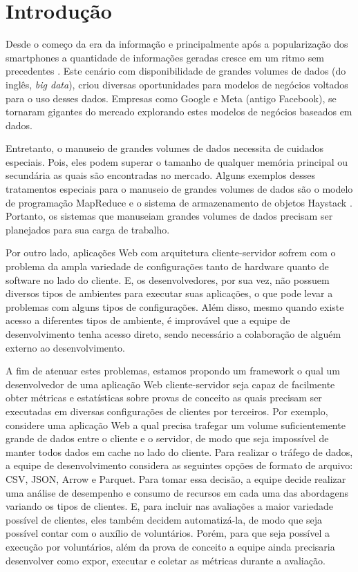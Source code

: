 \documentclass[12pt]{tcc}
\begin{document}
\dtables
	

\justifying
	
\chapter{Introdução}
\label{sec:introducao}

Desde o começo da era da informação e principalmente após a popularização dos smartphones a quantidade de informações geradas cresce em um ritmo sem precedentes \citep{Gandomi2015Beyond}.
Este cenário com disponibilidade de grandes volumes de dados (do inglês, \emph{big data}), criou diversas oportunidades para modelos de negócios voltados para o uso desses dados.
Empresas como Google e Meta (antigo Facebook), se tornaram gigantes do mercado explorando estes modelos de negócios baseados em dados.

Entretanto, o manuseio de grandes volumes de dados necessita de cuidados especiais.
Pois, eles podem superar o tamanho de qualquer memória principal ou secundária as quais são encontradas no mercado.
Alguns exemplos desses tratamentos especiais para o manuseio de grandes volumes de dados são o modelo de programação MapReduce \citep{Dean2008MapReduce} e o sistema de armazenamento de objetos Haystack \citep{Beaver2010Finding}.
Portanto, os sistemas que manuseiam grandes volumes de dados precisam ser planejados para sua carga de trabalho.

Por outro lado, aplicações Web com arquitetura cliente-servidor sofrem com o problema da ampla variedade de configurações tanto de hardware quanto de software no lado do cliente.
E, os desenvolvedores, por sua vez, não possuem diversos tipos de ambientes para executar suas aplicações, o que pode levar a problemas com alguns tipos de configurações.
Além disso, mesmo quando existe acesso a diferentes tipos de ambiente, é improvável que a equipe de desenvolvimento tenha acesso direto, sendo necessário a colaboração de alguém externo ao desenvolvimento.

A fim de atenuar estes problemas, estamos propondo um framework o qual um desenvolvedor de uma aplicação Web cliente-servidor seja capaz de facilmente obter métricas e estatísticas sobre provas de conceito as quais precisam ser executadas em diversas configurações de clientes por terceiros.
Por exemplo, considere uma aplicação Web a qual precisa trafegar um volume suficientemente grande de dados entre o cliente e o servidor, de modo que seja impossível de manter todos dados em cache no lado do cliente.
Para realizar o tráfego de dados, a equipe de desenvolvimento considera as seguintes opções de formato de arquivo: CSV, JSON, Arrow e Parquet.
Para tomar essa decisão, a equipe decide realizar uma análise de desempenho e consumo de recursos em cada uma das abordagens variando os tipos de clientes.
E, para incluir nas avaliações a maior variedade possível de clientes, eles também decidem automatizá-la, de modo que seja possível contar com o auxílio de voluntários.
Porém, para que seja possível a execução por voluntários, além da prova de conceito a equipe ainda precisaria desenvolver como expor, executar e coletar as métricas durante a avaliação.
\end{document}

